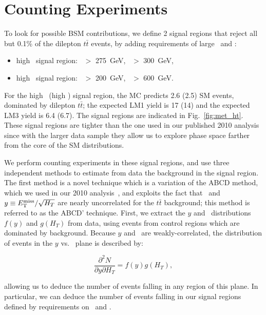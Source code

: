 \section{Counting Experiments}
\label{sec:datadriven}

To look for possible BSM contributions, we define 2 signal regions that reject all but
0.1\% of the dilepton $t\bar{t}$ events, by adding requirements of large \MET\ and \Ht:

\begin{itemize}
\item high \MET\ signal region: \MET\ $>$ 275~GeV, \Ht\ $>$ 300~GeV,
\item high \Ht\ signal region:  \MET\ $>$ 200~GeV, \Ht\ $>$ 600~GeV.
\end{itemize}

For the high \MET\ (high \Ht) signal region, the MC predicts 2.6 (2.5) SM events, 
dominated by dilepton $t\bar{t}$; the expected LM1 yield is 17 (14) and the
expected LM3 yield is 6.4 (6.7). The signal regions are indicated in Fig.~\ref{fig:met_ht}.
These signal regions are tighter than the one used in our published 2010 analysis since 
with the larger data sample they allow us to explore phase space farther from the core
of the SM distributions.


We perform counting experiments in these signal regions, and use three independent methods to estimate from data the background in the signal region.
The first method is a novel technique which is a variation of the ABCD method, which we used in our 2010 analysis~\cite{ref:ospaper}, 
and exploits the fact that \HT\ and $y \equiv E_{\mathrm{T}}^{\text{miss}}/\sqrt{H_T}$ are nearly uncorrelated for the $t\bar{t}$ background;
this method is referred to as the ABCD' technique. First, we extract the $y$ and \Ht\ distributions 
$f(y)$ and $g(H_T)$ from data, using events from control regions which are dominated by background. 
Because $y$ and \Ht\ are weakly-correlated, the distribution of events in the $y$ vs. \Ht\ plane is described by:

\begin{equation}
\label{eq:abcdprime}
\frac{\partial^2 N}{\partial y \partial H_T} = f(y)g(H_T),
\end{equation}

allowing us to deduce the number of events falling in any region of this plane. In particular,
we can deduce the number of events falling in our signal regions defined by requirements on \MET\ and \Ht.

